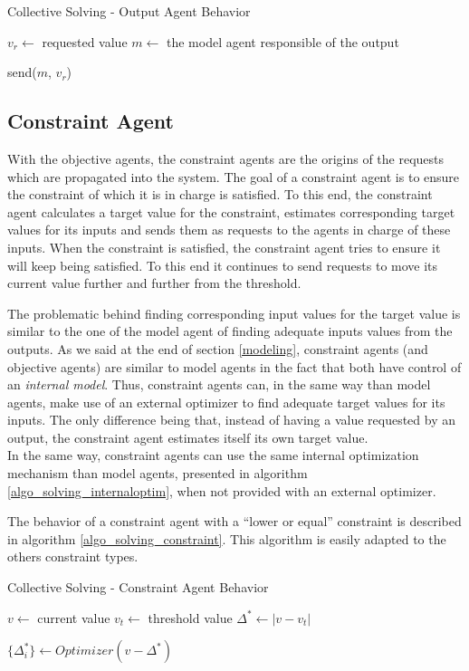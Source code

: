 \begin{algorithm}
\caption{Collective Solving - Output Agent Behavior}
\label{algo_solving_output}

	$v_r \leftarrow$ requested value\;
	$m \leftarrow$ the model agent responsible of the output \;
	
	send($m$, $v_r$) \;
	
\end{algorithm}

\subsection{Constraint Agent}

With the objective agents, the constraint agents are the origins of the requests which are propagated into the system. The goal of a constraint agent is to ensure the constraint of which it is in charge is satisfied. To this end, the constraint agent calculates a target value for the constraint, estimates corresponding target values for its inputs and sends them as requests to the agents in charge of these inputs. When the constraint is satisfied, the constraint agent tries to ensure it will keep being satisfied. To this end it continues to send requests to move its current value further and further from the threshold.

The problematic behind finding corresponding input values for the target value is similar to the one of the model agent of finding adequate inputs values from the outputs. As we said at the end of section \ref{modeling}, constraint agents (and objective agents) are similar to model agents in the fact that both have control of an \emph{internal model}. Thus, constraint agents can, in the same way than model agents, make use of an external optimizer to find adequate target values for its inputs. The only difference being that, instead of having a value requested by an output, the constraint agent estimates itself its own target value.\\
In the same way, constraint agents can use the same internal optimization mechanism than model agents, presented in algorithm \ref{algo_solving_internaloptim},  when not provided with an external optimizer.

The behavior of a constraint agent with a \enquote{lower or equal} constraint is described in algorithm \ref{algo_solving_constraint}. This algorithm is easily adapted to the others constraint types.

\begin{algorithm}
\caption{Collective Solving - Constraint Agent Behavior}
\label{algo_solving_constraint}

$v \leftarrow $ current value\;
$v_t \leftarrow $ threshold value\;
$\Delta^* \leftarrow |v - v_t|$\;

\BlankLine
$\{ \Delta^*_i \} \leftarrow Optimizer(v - \Delta^*)$\;
\end{algorithm}

